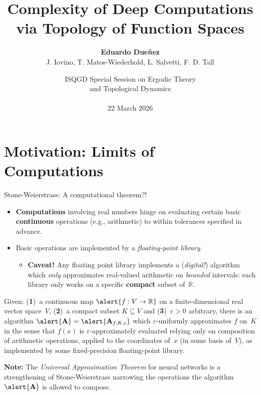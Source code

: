\documentclass{beamer}
\title[Complexity via Topology]{Complexity of Deep Computations\\ via Topology of Function Spaces}
\author[\textbf{Dueñez} \emph{et al.}]{\textbf{Eduardo Dueñez}\inst{1}\\ J. Iovino\inst{1}, T. Matos-Wiederhold\inst{2}, L. Salvetti\inst{2}, F. D. Tall\inst{2}}
\institute[UTSA, U. Toronto]{
    \inst{1} University of Texas at San Antonio \and
    \inst{2} University of Toronto \and
}
\date{ISQGD Special Session on Ergodic Theory\\
  and Topological Dynamics\\\hfill\\
  22 March 2026
}
\begin{document}
\begin{frame}
    \titlepage
\end{frame}

\section{Motivation: Limits of Computations}

\begin{frame}{Stone-Weierstrass: A computational theorem?!}
  \begin{itemize}
  \item \textbf{Computations} involving real numbers hinge on evaluating certain basic \textbf{continuous} operations (e.g., arithmetic) to within tolerances specified in advance.
  \item Basic operations are implemented by a \emph{floating-point library}.
    \begin{itemize}
    \item \alert{\textbf{Caveat!}} Any floating point library implements a (\emph{digital!}) algorithm which \emph{only} approximates real-valued arithmetic on \emph{bounded} intervals:
      each library only works on a \alert{specific \textbf{compact} subset of~$\mathbb{R}$}.
    \end{itemize}
  \end{itemize}
  \begin{theorem}
    Given: (\textbf{1})~a continuous map $\alert{f: V\to \mathbb{R}}$ on a \alert{finite-dimensional} real vector space~$V$,  (\textbf{2})~a \alert{compact subset $K\subseteq V$} and (\textbf{3})~\alert{$\varepsilon>0$} arbitrary, there is an algorithm $\alert{\mathbf{A}} = \alert{\mathbf{A}_{f, K, \varepsilon}}$ which $\varepsilon$-uniformly approximates $f$ on~$K$ in the sense that $f(x)$ is $\varepsilon$-approximately evaluated relying only on composition of arithmetic operations, applied to the \alert{coordinates} of~$x$ (in some basis of~$V$), as implemented by some fixed-precision floating-point library.
  \end{theorem}
  \footnotesize{\alert{\textbf{Note:}} The \emph{Universal Approximation Theorem} for neural networks is a strengthening of Stone-Weierstrass narrowing the operations the algorithm $\alert{\mathbf{A}}$ is allowed to compose.}
\end{frame}
\end{document}
